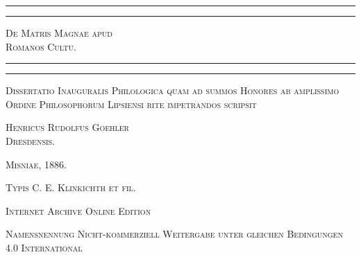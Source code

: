 \documentclass[a4paper, 11pt, oneside, polutonikogreek, german, twocolumn]{article}
\begin{document}
\begin{titlepage} %
	\centering %

	
	\rule{\textwidth}{1.6pt}\vspace*{-\baselineskip}\vspace*{2pt} %
	\rule{\textwidth}{0.4pt} %
	
	\vspace{1\baselineskip} %
	
	{\scshape\Huge De Matris Magnae apud \\ Romanos Cultu.}
	
	\vspace{1\baselineskip} %

	\rule{\textwidth}{0.4pt}\vspace*{-\baselineskip}\vspace{3.2pt} %
	\rule{\textwidth}{1.6pt} %
	
	\vspace{1\baselineskip} %
	
	
	{\scshape Dissertatio Inauguralis Philologica quam ad summos Honores ab amplissimo Ordine Philosophorum Lipsiensi rite impetrandos scripsit} %
	
	\vspace*{1\baselineskip} %
	
        {\scshape \Large Henricus Rudolfus Goehler\\\normalsize Dresdensis.} %

        \vspace*{\fill}

	\vspace{1\baselineskip}

	{\small\scshape Misniae, 1886.}
	
	{\small\scshape{Typis C. E. Klinkichth et fil.}}
	
	\vspace{0.5\baselineskip} %

        \scshape Internet Archive Online Edition%
	
	{\scshape\small Namensnennung Nicht-kommerziell Weitergabe unter gleichen Bedingungen 4.0 International} %
\end{titlepage}
\setlength{\parskip}{1mm plus1mm minus1mm}
\clearpage
\tableofcontents
\clearpage
\twocolumn
\end{document}
